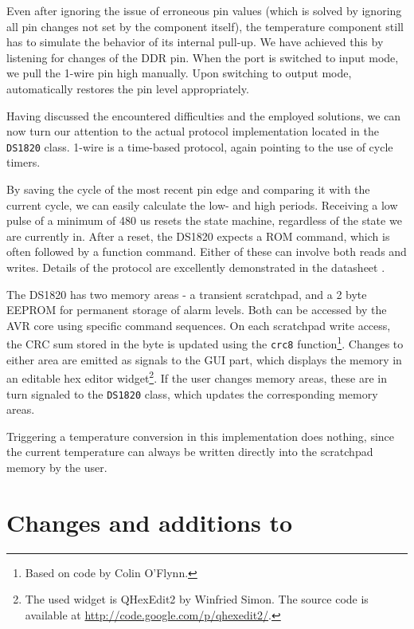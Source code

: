 Even after ignoring the issue of erroneous pin values (which is solved by ignoring
all pin changes not set by the component itself), the temperature component
still has to simulate the behavior of its internal pull-up. We have achieved this
by listening for changes of the \ac{DDR} pin. When the port is switched to input mode,
we pull the 1-wire pin high manually. Upon switching to output mode, \simavr
automatically restores the pin level appropriately.

Having discussed the encountered difficulties and the employed solutions, we
can now turn our attention to the actual protocol implementation located in the
\lstinline|DS1820| class. 1-wire is a time-based protocol, again pointing to the
use of cycle timers.

By saving the cycle of the most recent pin edge and comparing
it with the current cycle, we can easily calculate the low- and high periods.
Receiving a low pulse of a minimum of 480 \ac{us} resets the state machine,
regardless of the state we are currently in. After a reset, the DS1820
expects a ROM command, which is often followed by a function command. Either of
these can involve both reads and writes. Details of the protocol are excellently
demonstrated in the datasheet \cite{maxim02}.

The DS1820 has two memory areas - a transient scratchpad, and a 2 byte \ac{EEPROM}
for permanent storage of alarm levels. Both can be accessed by the \ac{AVR} core
using specific command sequences. On each scratchpad write access, the \ac{CRC}
sum stored in the  byte is updated using the \lstinline|crc8| function\footnote{
%
Based on code by Colin O'Flynn.
%
}. Changes to either area are emitted as signals to the \ac{GUI} part, which
displays the memory in an editable hex editor widget\footnote{
%
The used widget is QHexEdit2 by Winfried Simon. The source code is available
at \url{http://code.google.com/p/qhexedit2/}.
%
}. If the user changes memory areas, these are in turn signaled to the
\lstinline|DS1820| class, which updates the corresponding memory areas.

Triggering a temperature conversion in this implementation does nothing, since the
current temperature can always be written directly into the scratchpad memory by the user.

\section{Changes and additions to \simavr}

